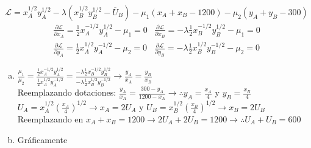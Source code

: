 $$\mathscr{L}= x_{A}^{1/2}y_{A}^{1/2} - \lambda \left( x_{B}^{1/2}y_{B}^{1/2} - \overline{U}_B\right)  - \mu_1\left( x_A+x_B-1200\right) - \mu_2\left( y_A + y_B - 300\right)$$
	$$
	\begin{array}{c|c}
		\frac{\partial \mathscr{L}}{\partial x_A} = \frac{1}{2}x_{A}^{-1/2}y_{A}^{1/2} - \mu_1 = 0 & \frac{\partial \mathscr{L}}{\partial x_B} = -\lambda\frac{1}{2}x_{B}^{-1/2}y_{B}^{1/2} - \mu_1 = 0\\[0.4cm]
		\frac{\partial \mathscr{L}}{\partial y_A} = \frac{1}{2}x_{A}^{1/2}y_{A}^{-1/2} - \mu_2 = 0 & \frac{\partial \mathscr{L}}{\partial y_B} = -\lambda\frac{1}{2}x_{B}^{1/2}y_{B}^{-1/2} - \mu_2 = 0
	\end{array}
	$$
	\begin{enumerate}[a)]
			\item $\frac{\mu_1}{\mu_2} = \frac{\frac{1}{2}x_{A}^{-1/2}y_{A}^{1/2}}{\frac{1}{2}x_{A}^{1/2}y_{A}^{-1/2}} = \frac{-\lambda\frac{1}{2}x_{B}^{-1/2}y_{B}^{1/2}}{-\lambda\frac{1}{2}x_{B}^{1/2}y_{B}^{-1/2}} \longrightarrow \frac{y_A}{x_A} = \frac{y_B}{x_B}$\\[0.3cm]
				Reemplazando dotaciones: $ \frac{y_A}{x_A} = \frac{300 - y_A}{1200 - x_A} \longrightarrow \therefore y_A = \frac{x_A}{4} \text{ y } y_B = \frac{x_B}{4}$\\
				
				$U_A = x_A^{1/2}\left( \frac{x_A}{4}\right) ^{1/2} \longrightarrow x_A = 2U_A$ y $U_B = x_B^{1/2}\left( \frac{x_B}{4}\right) ^{1/2} \longrightarrow x_B = 2U_B$\\[0.3cm]
				Reemplazando en $x_A+x_B=1200 \longrightarrow 2U_A + 2U_B = 1200 \longrightarrow \therefore U_A + U_B = 600$
			\item Gráficamente
					\begin{center}
					\end{center}
	\end{enumerate}